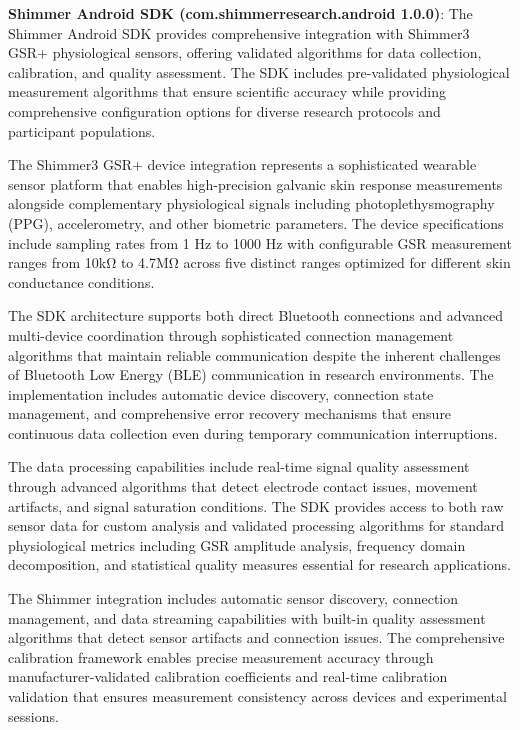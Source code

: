 \documentclass[12pt,a4paper]{article}
\begin{document}
\textbf{Shimmer Android SDK (com.shimmerresearch.android 1.0.0)}: The Shimmer Android SDK provides comprehensive integration
with Shimmer3 GSR+ physiological sensors, offering validated algorithms for data collection, calibration, and quality
assessment. The SDK includes pre-validated physiological measurement algorithms that ensure scientific accuracy while
providing comprehensive configuration options for diverse research protocols and participant populations.

The Shimmer3 GSR+ device integration represents a sophisticated wearable sensor platform that enables high-precision
galvanic skin response measurements alongside complementary physiological signals including photoplethysmography (PPG),
accelerometry, and other biometric parameters. The device specifications include sampling rates from 1 Hz to 1000 Hz
with configurable GSR measurement ranges from 10kΩ to 4.7MΩ across five distinct ranges optimized for different skin
conductance conditions.

The SDK architecture supports both direct Bluetooth connections and advanced multi-device coordination through
sophisticated connection management algorithms that maintain reliable communication despite the inherent challenges of
Bluetooth Low Energy (BLE) communication in research environments. The implementation includes automatic device
discovery, connection state management, and comprehensive error recovery mechanisms that ensure continuous data
collection even during temporary communication interruptions.

The data processing capabilities include real-time signal quality assessment through advanced algorithms that detect
electrode contact issues, movement artifacts, and signal saturation conditions. The SDK provides access to both raw
sensor data for custom analysis and validated processing algorithms for standard physiological metrics including GSR
amplitude analysis, frequency domain decomposition, and statistical quality measures essential for research
applications.

The Shimmer integration includes automatic sensor discovery, connection management, and data streaming capabilities with
built-in quality assessment algorithms that detect sensor artifacts and connection issues. The comprehensive calibration
framework enables precise measurement accuracy through manufacturer-validated calibration coefficients and real-time
calibration validation that ensures measurement consistency across devices and experimental sessions.
\end{document}
